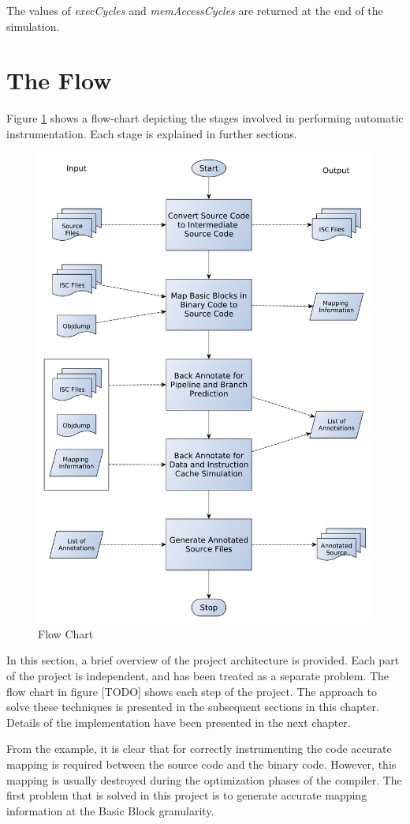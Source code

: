 The values of \emph{execCycles} and \emph{memAccessCycles} are returned at the end of the simulation.

\section{The Flow}

Figure \ref{fig:hcsFlowChart} shows a flow-chart depicting the stages involved in performing automatic instrumentation. Each stage is explained in further sections.

\begin{figure}[h]
\center
\includegraphics[width=.78\textwidth]{figures/HCS_FlowChart.pdf}
\caption{Flow Chart}
\label{fig:hcsFlowChart}
\end{figure}

In this section, a brief overview of the project architecture is provided. Each part of the project is independent, and has been treated as a separate problem. The flow chart in figure [TODO] shows each step of the project. The approach to solve these techniques is presented in the subsequent sections in this chapter. Details of the implementation have been presented in the next chapter.

From the example, it is clear that for correctly instrumenting the code accurate mapping is required between the source code and the binary code. However, this mapping is usually destroyed during the optimization phases of the compiler. The first problem that is solved in this project is to generate accurate mapping information at the Basic Block granularity. 

